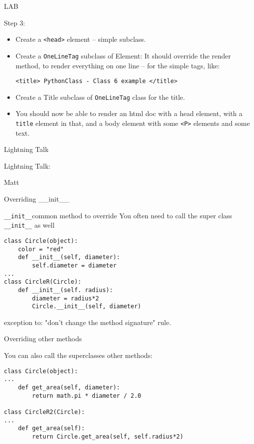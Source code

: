 \documentclass{beamer}
\begin{document}
\begin{frame}[fragile]{LAB}

\vfill
{\Large Step 3:}

\begin{itemize}
  \item Create a \verb|<head>| element -- simple subclass.
  \item Create a \verb|OneLineTag| subclass of Element:
        It should override the render method, to render everything on one line --
        for the simple tags, like:
    
        \verb|<title> PythonClass - Class 6 example </title>|
  \item Create a Title subclass of \verb|OneLineTag| class for the title.
  
  \item You should now be able to render an html doc with a head element, with
       a \verb|title| element in that, and a body element with some \verb|<P>|
       elements and some text.
\end{itemize}

\end{frame}


\begin{frame}{Lightning Talk}

{\centering

\vfill
{\LARGE Lightning Talk:  }

\vfill
{\Huge Matt}

\vfill
}
\end{frame}

\begin{frame}[fragile]{Overriding \_\_init\_\_}

{\Large \verb|__init__|common method to override}
\vfill
{\large You often need to call the super class \verb|__init__| as well}
\vfill
\begin{verbatim}
class Circle(object):
    color = "red"
    def __init__(self, diameter):
        self.diameter = diameter
...
class CircleR(Circle):
    def __init__(self. radius):
        diameter = radius*2
        Circle.__init__(self, diameter)
\end{verbatim}
\vfill
exception to: "don't change the method signature" rule.
\end{frame} 

\begin{frame}[fragile]{Overriding other methods}

{\large You can also call the superclasses other methods:}
\vfill
\begin{verbatim}
class Circle(object):
...
    def get_area(self, diameter):
        return math.pi * diameter / 2.0

class CircleR2(Circle):
...
    def get_area(self):
        return Circle.get_area(self, self.radius*2)
        
\end{verbatim}
\end{frame} 
\end{document}
